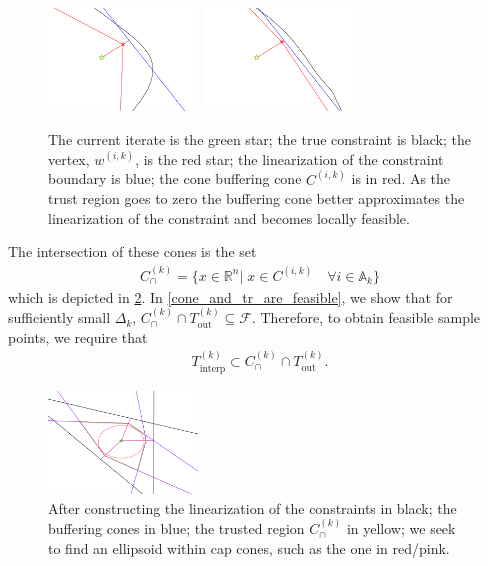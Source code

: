 \documentclass{article}
\theoremstyle{case}
\numberwithin{theorem}{subsection}
\newcommand{\activeconstraintsk}{{\mathbb A_{k}}}
\newcommand{\capcones}{{C^{(k)}_{\cap}}}
\newcommand{\dk}{\Delta_k}
\newcommand{\feasible}{{\mathcal F}}
\newcommand{\outertrk}{{T_{\text{out}}^{(k)}}}
\newcommand{\Rn}{\mathbb R^n}
\newcommand{\sampletrk}{{T_{\text{interp}}^{(k)}}}
\newcommand{\wik}{{w^{(i, k)}}}
\newcommand{\fik}{{C^{(i, k)}}}
\begin{document}
\begin{figure}[ht]
    \centering
    \includegraphics[width=150px]{images/explanation_2.png}
    \includegraphics[width=150px]{images/explanation_3.png}
    \caption{
    	The current iterate is the green star;
    	the true constraint is black;
    	the vertex, $\wik$, is the red star;
    	the linearization of the constraint boundary is blue;
    	the cone buffering cone $\fik$ is in red.
    	As the trust region goes to zero the buffering cone better approximates the linearization of the constraint and becomes locally feasible.
	}
    \label{explanation_2}
\end{figure}
The intersection of these cones is the set
\begin{align}
\capcones = \{x\in\Rn | \; x \in \fik \quad \forall i \in \activeconstraintsk \} \label{define_capcones}
\end{align}
which is depicted in \cref{completed_2}.
In \cref{cone_and_tr_are_feasible}, we show that for sufficiently small $\dk$, $\capcones \cap \outertrk \subseteq \feasible$.
\color{red}
Therefore, to obtain feasible sample points, we require that 
\begin{align*}
\sampletrk \subset \capcones \cap \outertrk.
\end{align*}
\color{black}




\begin{figure}[ht]
    \centering
    \includegraphics[width=150px]{images/completed_2.png}
    \caption{
    	After constructing 
    	the linearization of the constraints in black;
    	the buffering cones in blue;
    	the trusted region $\capcones$ in yellow;
    	we seek to find an ellipsoid within cap cones, such as the one in red/pink.
	}
    \label{completed_2}
\end{figure}
\end{document}
